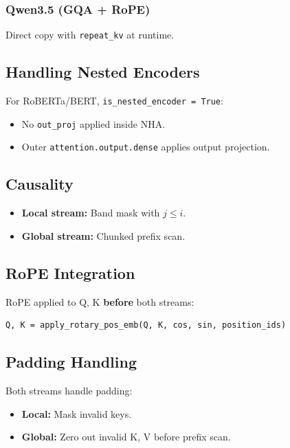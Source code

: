 \subsubsection{Qwen3.5 (GQA + RoPE)}

Direct copy with \texttt{repeat\_kv} at runtime.

\subsection{Handling Nested Encoders}

For RoBERTa/BERT, \texttt{is\_nested\_encoder = True}:
\begin{itemize}
\item No \texttt{out\_proj} applied inside NHA.
\item Outer \texttt{attention.output.dense} applies output projection.

\end{itemize}
\subsection{Causality}

\begin{itemize}
\item \textbf{Local stream:} Band mask with $j \le i$.
\item \textbf{Global stream:} Chunked prefix scan.

\end{itemize}
\subsection{RoPE Integration}

RoPE applied to Q, K \textbf{before} both streams:

\begin{lstlisting}
Q, K = apply_rotary_pos_emb(Q, K, cos, sin, position_ids)
\end{lstlisting}

\subsection{Padding Handling}

Both streams handle padding:
\begin{itemize}
\item \textbf{Local:} Mask invalid keys.
\item \textbf{Global:} Zero out invalid K, V before prefix scan.

\end{itemize}
